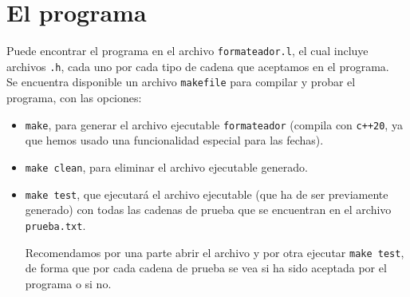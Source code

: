\documentclass[12pt]{article}
\begin{document}
    \section{El programa}
    Puede encontrar el programa en el archivo \verb|formateador.l|, el cual incluye archivos \verb|.h|, cada uno por cada tipo de cadena que aceptamos en el programa.\\

    Se encuentra disponible un archivo \verb|makefile| para compilar y probar el programa, con las opciones:
    \begin{itemize}
        \item \verb|make|, para generar el archivo ejecutable \verb|formateador| (compila con \verb|c++20|, ya que hemos usado una funcionalidad especial para las fechas).
        \item \verb|make clean|, para eliminar el archivo ejecutable generado.
        \item \verb|make test|, que ejecutará el archivo ejecutable (que ha de ser previamente generado) con todas las cadenas de prueba que se encuentran en el archivo \verb|prueba.txt|.

            Recomendamos por una parte abrir el archivo y por otra ejecutar \verb|make test|, de forma que por cada cadena de prueba se vea si ha sido aceptada por el programa o si no.
    \end{itemize}


    \newpage

    \fancyhead[R]{\helv \nouppercase{\rightmark}}
\end{document}

